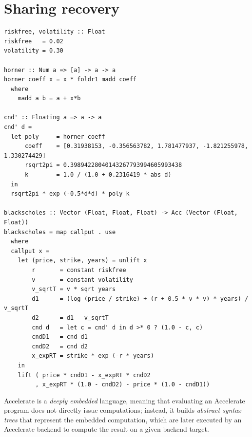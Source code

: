 % 

\section{Sharing recovery}
\label{sec:sharing_recovery}

\begin{lstlisting}[style=haskell
    ,float=tbp
    ,label=lst:black_scholes
    ,caption={Black-Scholes option pricing in Accelerate}]
riskfree, volatility :: Float
riskfree   = 0.02
volatility = 0.30

horner :: Num a => [a] -> a -> a
horner coeff x = x * foldr1 madd coeff
  where
    madd a b = a + x*b

cnd' :: Floating a => a -> a
cnd' d =
  let poly     = horner coeff
      coeff    = [0.31938153, -0.356563782, 1.781477937, -1.821255978, 1.330274429]
      rsqrt2pi = 0.39894228040143267793994605993438
      k        = 1.0 / (1.0 + 0.2316419 * abs d)
  in
  rsqrt2pi * exp (-0.5*d*d) * poly k

blackscholes :: Vector (Float, Float, Float) -> Acc (Vector (Float, Float))
blackscholes = map callput . use
  where
  callput x =
    let (price, strike, years) = unlift x
        r       = constant riskfree
        v       = constant volatility
        v_sqrtT = v * sqrt years
        d1      = (log (price / strike) + (r + 0.5 * v * v) * years) / v_sqrtT
        d2      = d1 - v_sqrtT
        cnd d   = let c = cnd' d in d >* 0 ? (1.0 - c, c)
        cndD1   = cnd d1
        cndD2   = cnd d2
        x_expRT = strike * exp (-r * years)
    in
    lift ( price * cndD1 - x_expRT * cndD2
         , x_expRT * (1.0 - cndD2) - price * (1.0 - cndD1))
\end{lstlisting}

Accelerate is a \emph{deeply embedded} language, meaning that evaluating an
Accelerate program does not directly issue computations; instead, it builds
\emph{abstract syntax trees} that represent the
embedded computation, which are later executed by an Accelerate backend to
compute the result on a given backend target.

